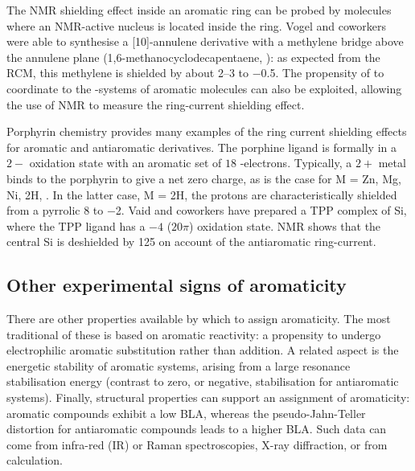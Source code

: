 	 	The NMR shielding effect inside an aromatic ring can be probed by molecules where an NMR-active nucleus is located inside the ring. Vogel and coworkers were able to synthesise a [10]-annulene derivative with a methylene bridge above the annulene plane (1,6-methanocyclodecapentaene, ): as expected from the RCM, this methylene is shielded by about \SIrange{2}{3}{\ppm} to \SI{-0.5}{\ppm}.\autocite{Vogel1967} The propensity of  to coordinate to the \pii{}-systems of aromatic molecules can also be exploited, allowing the use of  NMR to measure the ring-current shielding effect.\autocite{Schleyer1996a}

	 	Porphyrin chemistry provides many examples of the ring current shielding effects for aromatic and antiaromatic derivatives. The porphine ligand is formally in a $2-$ oxidation state with an aromatic set of $18$ \pii{}-electrons. Typically, a $2+$ metal binds to the porphyrin to give a net zero charge, as is the case for M = Zn, Mg, Ni, 2H, . In the latter case, M = 2H, the protons are characteristically shielded from a pyrrolic \SI{8}{\ppm} to \SI{-2}{\ppm}. Vaid and coworkers have prepared a TPP complex of Si, where the TPP ligand has a $-4$ ($20\pi$) oxidation state.  NMR shows that the central Si is deshielded by \SI{125}{\ppm} on account of the antiaromatic ring-current.\autocite{Cissell2005}

	\subsection{Other experimental signs of aromaticity}
		
		There are other properties available by which to assign aromaticity. The most traditional of these is based on aromatic reactivity: a propensity to undergo electrophilic aromatic substitution rather than addition. A related aspect is the energetic stability of aromatic systems, arising from a large resonance stabilisation energy (contrast to zero, or negative, stabilisation for antiaromatic systems). Finally, structural properties can support an assignment of aromaticity: aromatic compounds exhibit a low BLA, whereas the pseudo-Jahn-Teller distortion for antiaromatic compounds leads to a higher BLA\@. Such data can come from infra-red (IR) or Raman spectroscopies, X-ray diffraction, or from calculation.%

